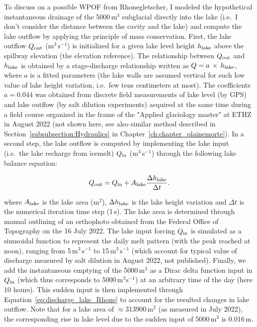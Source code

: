 To discuss on a possible WPOF from Rhonegletscher, I modeled the hypothetical instantaneous drainage of the 5000\,m$^3$ subglacial directly into the lake (i.e.\ I don't consider the distance between the cavity and the lake) and compute the lake outflow by applying the principle of mass conservation. First, the lake outflow $Q_{\rm out}$ (m$^3$\,s$^{-1}$) is initialized for a given lake level height $h_{\rm lake}$ above the spillway elevation (the elevation reference). The relationship between $Q_{\rm out}$ and $h_{\rm lake}$ is obtained by a stage-discharge relationship written as $Q = a\,\times\,h_{\rm lake}$, where $a$ is a fitted parameters (the lake walls are assumed vertical for such low value of lake height variation, i.e.\ few tens centimeters at most). The coefficients $a = 0.044$ was obtained from discrete field measurements of lake level (by GPS) and lake outflow (by salt dilution experiments) acquired at the same time during a field course organized in the frame of the "Applied glaciology master" at ETHZ in August 2022 (not shown here, see also similar method described in Section~\ref{subsubsection:Hydraulics} in Chapter~\ref{ch:chapter_plainemorte}). In a second step, the lake outflow is computed by implementing the lake input (i.e.\ the lake recharge from icemelt) $Q_{\rm in}$ (m$^3$\,s$^{-1}$) through the following lake balance equation:

\begin{equation}
  \label{eq:discharge_lake_Rhone}
Q_{\rm out} = Q_{\rm in} + A_{\rm lake}\frac{\Delta h_{\rm lake}}{\Delta t}.
\end{equation}

where $A_{\rm lake}$ is the lake area (m$^2$), $\Delta h_{\rm lake}$ is the lake height variation and $\Delta t$ is the numerical iteration time step (1\,s). The lake area is determined through manual outlining of an orthophoto obtained from the Federal Office of Topography on the 16 July 2022. The lake input forcing $Q_{\rm in}$ is simulated as a sinusoidal function to represent the daily melt pattern (with the peak reached at noon), ranging from 5\,m$^3$\,s$^{-1}$ to 15\,m$^3$\,s$^{-1}$ (which account for typical value of discharge measured by salt dilution in August 2022, not published). Finally, we add the instantaneous emptying of the 5000\,m$^3$ as a Dirac delta function input in $Q_{\rm in}$ (which thus corresponds to 5000\,m$^3$s$^{-1}$) at an arbitrary time of the day (here 10 hours). This sudden input is then implemented through Equation~\ref{eq:discharge_lake_Rhone} to account for the resulted changes in lake outflow. Note that for a lake area of $\approx$313900\,m$^2$ (as measured in July 2022), the corresponding rise in lake level due to the sudden input of 5000\,m$^3$ is 0.016\,m.

